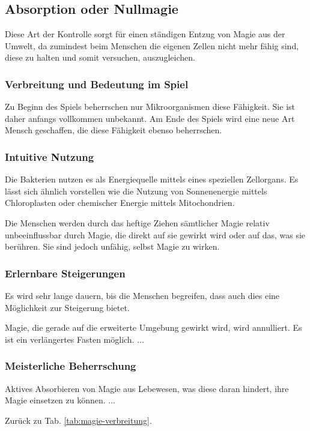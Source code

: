 \subsection{Absorption oder Nullmagie}\label{sec:nullmagie}
Diese Art der Kontrolle sorgt für einen ständigen Entzug von Magie aus der Umwelt, da zumindest beim Menschen die eigenen Zellen nicht mehr fähig sind, diese zu halten und somit versuchen, auszugleichen. 

\subsubsection{Verbreitung und Bedeutung im Spiel}
Zu Beginn des Spiels beherrschen nur Mikroorganismen diese Fähigkeit. Sie ist daher anfangs vollkommen unbekannt. Am Ende des Spiels wird eine neue Art Mensch geschaffen, die diese Fähigkeit ebenso beherrschen.

\subsubsection{Intuitive Nutzung}
Die Bakterien nutzen es als Energiequelle mittels eines speziellen Zellorgans. Es lässt sich ähnlich vorstellen wie die Nutzung von Sonnenenergie mittels Chloroplasten oder chemischer Energie mittels Mitochondrien. 

Die Menschen werden durch das heftige Ziehen sämtlicher Magie relativ unbeeinflussbar durch Magie, die direkt auf sie gewirkt wird oder auf das, was sie berühren. Sie sind jedoch unfähig, selbst Magie zu wirken.

\subsubsection{Erlernbare Steigerungen}
Es wird sehr lange dauern, bis die Menschen begreifen, dass auch dies eine Möglichkeit zur Steigerung bietet.
\begin{outline}
	\1 Magie, die gerade auf die erweiterte Umgebung gewirkt wird, wird annulliert.
	\1 Es ist ein verlängertes Fasten möglich.
	\1 ...
\end{outline}

\subsubsection{Meisterliche Beherrschung} 
\begin{outline}
	\1 Aktives Absorbieren von Magie aus Lebewesen, was diese daran hindert, ihre Magie einsetzen zu können.
	\1 ...
\end{outline}
Zurück zu Tab. \ref{tab:magie-verbreitung}.



